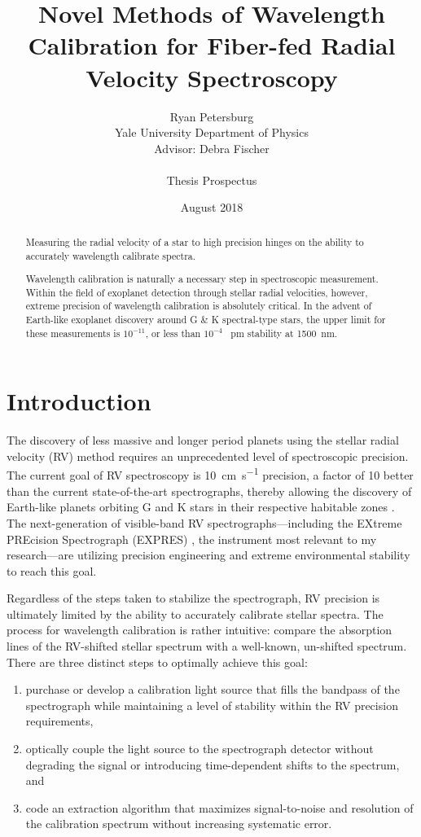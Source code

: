 \documentclass[11pt]{article}
\title{Novel Methods of Wavelength Calibration for Fiber-fed Radial Velocity Spectroscopy}
\author{Ryan Petersburg\\
Yale University Department of Physics\\
Advisor: Debra Fischer\\
\\
Thesis Prospectus}
\date{August 2018}
\begin{document}
\maketitle

\begin{abstract}

Measuring the radial velocity of a star to high precision hinges on the ability to accurately wavelength calibrate spectra.


Wavelength calibration is naturally a necessary step in spectroscopic measurement. Within the field of exoplanet detection through stellar radial velocities, however, extreme precision of wavelength calibration is absolutely critical. In the advent of Earth-like exoplanet discovery around G \& K spectral-type stars, the upper limit for these measurements is $10^{-11}$, or less than $10^{-4}$ \SI{}{\pico\meter} stability at \SI{1500}{\nano\meter}.

\end{abstract}

\pagebreak

\section{Introduction}

The discovery of less massive and longer period planets using the stellar radial velocity (RV) method requires an unprecedented level of spectroscopic precision. The current goal of RV spectroscopy is \SI{10}{\centi\meter\per\second} precision, a factor of 10 better than the current state-of-the-art spectrographs, thereby allowing the discovery of Earth-like planets orbiting G and K stars in their respective habitable zones \citep{Fischer2016}. The next-generation of visible-band RV spectrographs---including the EXtreme PREcision Spectrograph (EXPRES) \citep{Jurgenson2016}, the instrument most relevant to my research---are utilizing precision engineering and extreme environmental stability to reach this goal.

Regardless of the steps taken to stabilize the spectrograph, RV precision is ultimately limited by the ability to accurately calibrate stellar spectra. The process for wavelength calibration is rather intuitive: compare the absorption lines of the RV-shifted stellar spectrum with a well-known, un-shifted spectrum. There are three distinct steps to optimally achieve this goal:
\begin{enumerate}
    \item purchase or develop a calibration light source that fills the bandpass of the spectrograph while maintaining a level of stability within the RV precision requirements,
    \item optically couple the light source to the spectrograph detector without degrading the signal or introducing time-dependent shifts to the spectrum, and
    \item code an extraction algorithm that maximizes signal-to-noise and resolution of the calibration spectrum without increasing systematic error.
\end{enumerate}
\end{document}
